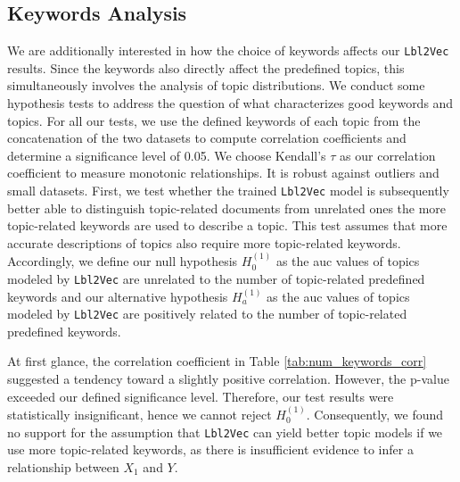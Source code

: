\documentclass[a4paper,twoside]{article}
\begin{document}
\subsection{Keywords Analysis}

We are additionally interested in how the choice of keywords affects our \texttt{Lbl2Vec} results. Since the keywords also directly affect the predefined topics, this simultaneously involves the analysis of topic distributions. We conduct some hypothesis tests to address the question of what characterizes good keywords and topics. For all our tests, we use the defined keywords of each topic from the concatenation of the two datasets to compute correlation coefficients and determine a significance level of 0.05. We choose Kendall's $\tau$ as our correlation coefficient to measure monotonic relationships. It is robust against outliers and small datasets.\newline
\newline First, we test whether the trained \texttt{Lbl2Vec} model is subsequently better able to distinguish topic-related documents from unrelated ones the more topic-related keywords are used to describe a topic. This test assumes that more accurate descriptions of topics also require more topic-related keywords. Accordingly, we define our null hypothesis $H_{0}^{(1)}$ as the \ac{auc} values of topics modeled by \texttt{Lbl2Vec} are unrelated to the number of topic-related predefined keywords and our alternative hypothesis $H_{a}^{(1)}$ as the \ac{auc} values of topics modeled by \texttt{Lbl2Vec} are positively related to the number of topic-related predefined keywords. 
\begin{table}[ht]
\centering
{}\caption{\label{tab:num_keywords_corr} Correlation values that measure the relationship between ${X_{1}=\textrm{number of defined topic keywords}}$ and ${Y=\textrm{\ac{auc}}}$ value of a topic. $X_{{1}_{min}}=10$ and $X_{{1}_{max}}=44$.}
\end{table}
At first glance, the correlation coefficient in Table \ref{tab:num_keywords_corr} suggested a tendency toward a slightly positive correlation. However, the p-value exceeded our defined significance level. Therefore, our test results were statistically insignificant, hence we cannot reject $H_{0}^{(1)}$. Consequently, we found no support for the assumption that \texttt{Lbl2Vec} can yield better topic models if we use more topic-related keywords, as there is insufficient evidence to infer a relationship between $X_1$ and $Y$.\newline
\end{document}
